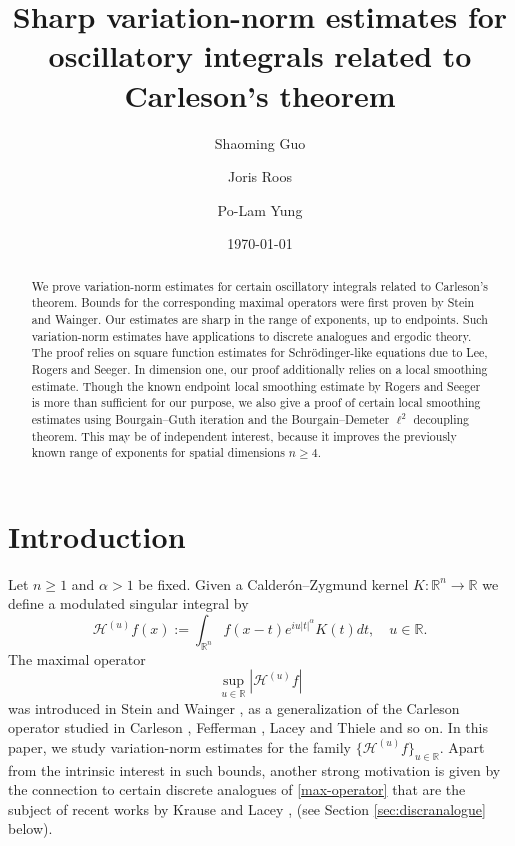 \documentclass[12pt,leqno]{amsart}
\title[variation-norm Stein--Wainger]{S\MakeLowercase{harp variation-norm estimates for oscillatory integrals related to} C\MakeLowercase{arleson's theorem}}
\author[S. Guo]{Shaoming Guo}
\author[J. Roos]{Joris Roos}
\author[P.-L. Yung]{Po-Lam Yung}
\date{\today}
\def\R{\mathbb{R}}
\theoremstyle{plain}
\numberwithin{equation}{section}
\begin{document}
\begin{abstract}
We prove variation-norm estimates for certain oscillatory integrals related to Carleson's theorem. Bounds for the corresponding maximal operators were first proven by Stein and Wainger. Our estimates are sharp in the range of exponents, up to endpoints. Such variation-norm estimates have applications to discrete analogues and ergodic theory. The  proof relies on square function estimates for Schr\"odinger-like equations due to Lee, Rogers and Seeger. In dimension one, our proof additionally relies on a local smoothing estimate. Though the known endpoint local smoothing estimate by Rogers and Seeger is more than sufficient for our purpose, we also give a proof of certain local smoothing estimates using Bourgain--Guth iteration and the Bourgain--Demeter $\ell^2$ decoupling theorem. This may be of independent interest, because it improves the previously known range of exponents for spatial dimensions $n\ge 4$.
\end{abstract}
\maketitle

\section{Introduction}

Let $n \geq 1$ and $\alpha > 1$ be fixed. Given a  Calder\'{o}n--Zygmund kernel $K: \R^n\to \R$ we define a modulated singular integral by
\begin{equation} \label{eq:Hu_def}
\mathcal{H}^{(u)} f(x) := \int_{\R^n} f(x-t) e^{i u |t|^{\alpha}} K(t)dt, \quad u \in \R.
\end{equation}
The maximal operator
\begin{equation}\label{max-operator}
\sup_{u \in \R} |\mathcal{H}^{(u)} f|
\end{equation}
was introduced in Stein and Wainger \cite{MR1879821}, as a generalization of the Carleson operator studied in Carleson \cite{MR0199631}, Fefferman \cite{MR0340926}, Lacey and Thiele \cite{MR1783613} and so on. In this paper, we study variation-norm estimates for the family $\{\mathcal{H}^{(u)} f\}_{u \in \R}$. Apart from the intrinsic interest in such bounds, another strong motivation is given by the connection to certain discrete analogues of \eqref{max-operator} that are the subject of recent works by Krause and Lacey \cite{MR3658135}, \cite{Kra18} (see Section \ref{sec:discranalogue} below).
\end{document}
